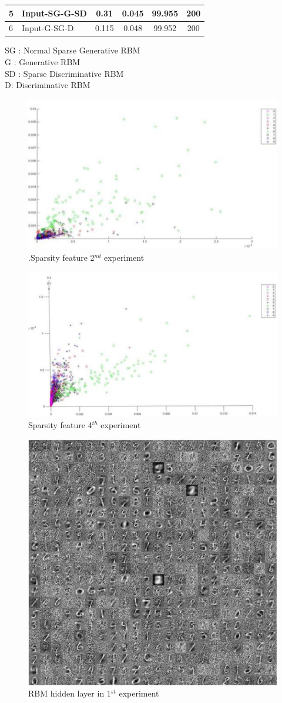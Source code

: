 \documentclass[conference]{IEEEtran}
\begin{document}
\begin{table}[h]
\begin{tabular}{|l|l|c|c|c|c|}
		5                                                                                & Input-SG-G-SD                               & 0.31                                                                 & 0.045                                                               & 99.955                                                           & 200            \\ \hline
		6                                                                                & Input-G-SG-D                                & 0.115                                                                & 0.048                                                               & 99.952                                                           & 200            \\ \hline
	\end{tabular}
\end{table}

SG  : Normal Sparse Generative RBM
\\G : Generative RBM
\\SD : Sparse Discriminative RBM
\\D: Discriminative RBM
\begin{figure}[h]
	\centering
	\includegraphics[width=.25\textwidth]{pics/fig2.jpg}
	\caption{.Sparsity feature 2$^{nd}$ experiment}
	\label{fig2}
\end{figure}

\begin{figure}[h]
	\centering
	\includegraphics[width=.25\textwidth]{pics/fig3.jpg}
	\caption{Sparsity feature 4$^{th}$ experiment}
	\label{fig3}
\end{figure}

\begin{figure}[h]
	\centering
	\includegraphics[width=.25\textwidth]{pics/fig4.jpg}
	\caption{RBM hidden layer in 1$^{st}$ experiment}
	\label{fig4}
\end{figure}
\end{document}
